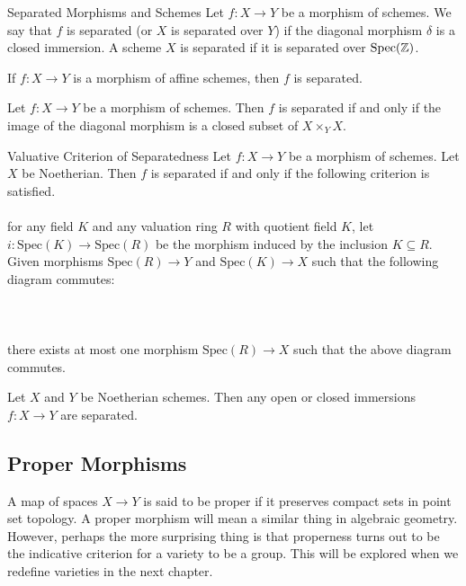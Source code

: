 \documentclass[a4paper]{article}
\begin{document}
\begin{defn}{Separated Morphisms and Schemes}{} Let $f:X\to Y$ be a morphism of schemes. We say that $f$ is separated (or $X$ is separated over $Y$) if the diagonal morphism $\delta$ is a closed immersion. A scheme $X$ is separated if it is separated over $\text{Spec}(\mathbb{Z})$. 
\end{defn}

\begin{prp}{}{} If $f:X\to Y$ is a morphism of affine schemes, then $f$ is separated. 
\end{prp}

\begin{prp}{}{} Let $f:X\to Y$ be a morphism of schemes. Then $f$ is separated if and only if the image of the diagonal morphism is a closed subset of $X\times_Y X$. 
\end{prp}

\begin{thm}{Valuative Criterion of Separatedness}{} Let $f:X\to Y$ be a morphism of schemes. Let $X$ be Noetherian. Then $f$ is separated if and only if the following criterion is satisfied. \\~\\

for any field $K$ and any valuation ring $R$ with quotient field $K$, let $i:\text{Spec}(K)\to\text{Spec}(R)$ be the morphism induced by the inclusion $K\subseteq R$. Given morphisms $\text{Spec}(R)\to Y$ and $\text{Spec}(K)\to X$ such that the following diagram commutes: \\~\\
 \\~\\
there exists at most one morphism $\text{Spec}(R)\to X$ such that the above diagram commutes. 
\end{thm}

\begin{prp}{}{} Let $X$ and $Y$ be Noetherian schemes. Then any open or closed immersions $f:X\to Y$ are separated. 
\end{prp}

\subsection{Proper Morphisms}
A map of spaces $X\to Y$ is said to be proper if it preserves compact sets in point set topology. A proper morphism will mean a similar thing in algebraic geometry. However, perhaps the more surprising thing is that properness turns out to be the indicative criterion for a variety to be a group. This will be explored when we redefine varieties in the next chapter. 
\end{document}
